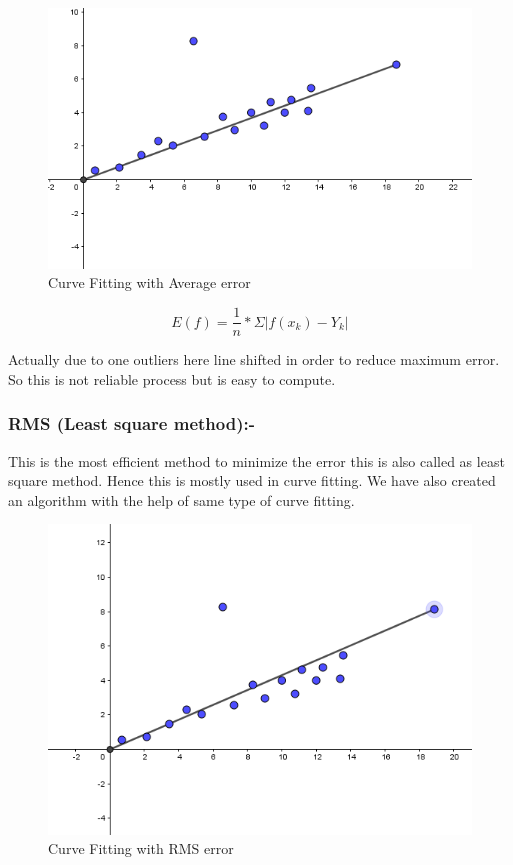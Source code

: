 \begin{figure}
\includegraphics{./figures/average.PNG}
\caption{Curve Fitting with Average error }
\end{figure}

\begin{equation}
E(f)=\frac{1}{n}*\Sigma|f(x_k)-Y_k| 
\end{equation}

Actually due to one outliers here line shifted in order to reduce maximum error. So this is not reliable process but is easy to compute.

\subsubsection{RMS (Least square method):-}
This is the most efficient method to minimize the error this is also called as least square method.
Hence this is mostly used in curve fitting.
We have also created an algorithm with the help of same type of curve fitting.

\begin{figure}
\includegraphics{./figures/RMS.PNG}
\caption{Curve Fitting with RMS error }
\end{figure}

